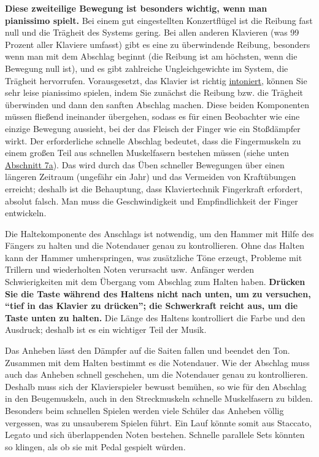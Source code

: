 \textbf{Diese zweiteilige Bewegung ist besonders wichtig, wenn man pianissimo spielt.}
Bei einem gut eingestellten Konzertflügel ist die Reibung fast null und die Trägheit des Systems gering.
Bei allen anderen Klavieren (was 99 Prozent aller Klaviere umfasst) gibt es eine zu überwindende Reibung, besonders wenn man mit dem Abschlag beginnt (die Reibung ist am höchsten, wenn die Bewegung null ist), und es gibt zahlreiche Ungleichgewichte im System, die Trägheit hervorrufen.
Vorausgesetzt, das Klavier ist richtig \hyperref[c2_7_hamm]{intoniert}, können Sie sehr leise pianissimo spielen, indem Sie zunächst die Reibung bzw. die Trägheit überwinden und dann den sanften Abschlag machen.
Diese beiden Komponenten müssen fließend ineinander übergehen, sodass es für einen Beobachter wie eine einzige Bewegung aussieht, bei der das Fleisch der Finger wie ein Stoßdämpfer wirkt.
Der erforderliche schnelle Abschlag bedeutet, dass die Fingermuskeln zu einem großen Teil aus schnellen Muskelfasern bestehen müssen (siehe unten \hyperref[c1iii7a]{Abschnitt 7a}).
Das wird durch das Üben schneller Bewegungen über einen längeren Zeitraum (ungefähr ein Jahr) und das Vermeiden von Kraftübungen erreicht; deshalb ist die Behauptung, dass Klaviertechnik Fingerkraft erfordert, absolut falsch.
Man muss die Geschwindigkeit und Empfindlichkeit der Finger entwickeln.

Die Haltekomponente des Anschlags ist notwendig, um den Hammer mit Hilfe des Fängers zu halten und die Notendauer genau zu kontrollieren.
Ohne das Halten kann der Hammer umherspringen, was zusätzliche Töne erzeugt, Probleme mit Trillern und wiederholten Noten verursacht usw.
Anfänger werden Schwierigkeiten mit dem Übergang vom Abschlag zum Halten haben.
\textbf{Drücken Sie die Taste während des Haltens nicht nach unten, um zu versuchen, \enquote{tief in das Klavier zu drücken}; die Schwerkraft reicht aus, um die Taste unten zu halten.}
Die Länge des Haltens kontrolliert die Farbe und den Ausdruck; deshalb ist es ein wichtiger Teil der Musik.

Das Anheben lässt den Dämpfer auf die Saiten fallen und beendet den Ton.
Zusammen mit dem Halten bestimmt es die Notendauer.
Wie der Abschlag muss auch das Anheben schnell geschehen, um die Notendauer genau zu kontrollieren.
Deshalb muss sich der Klavierspieler bewusst bemühen, so wie für den Abschlag in den Beugemuskeln, auch in den Streckmuskeln schnelle Muskelfasern zu bilden.
Besonders beim schnellen Spielen werden viele Schüler das Anheben völlig vergessen, was zu unsauberem Spielen führt.
Ein Lauf könnte somit aus Staccato, Legato und sich überlappenden Noten bestehen.
Schnelle parallele Sets könnten so klingen, als ob sie mit Pedal gespielt würden.

